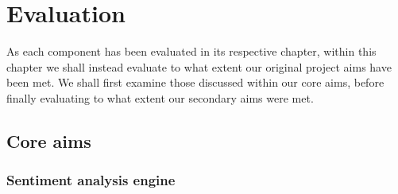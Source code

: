
\chapter{Evaluation}

As each component has been evaluated in its respective chapter, within this chapter we shall instead evaluate to what extent our original project aims have been met. We shall first examine those discussed within our core aims, before finally evaluating to what extent our secondary aims were met.

\section{Core aims}

\subsection{Sentiment analysis engine}

